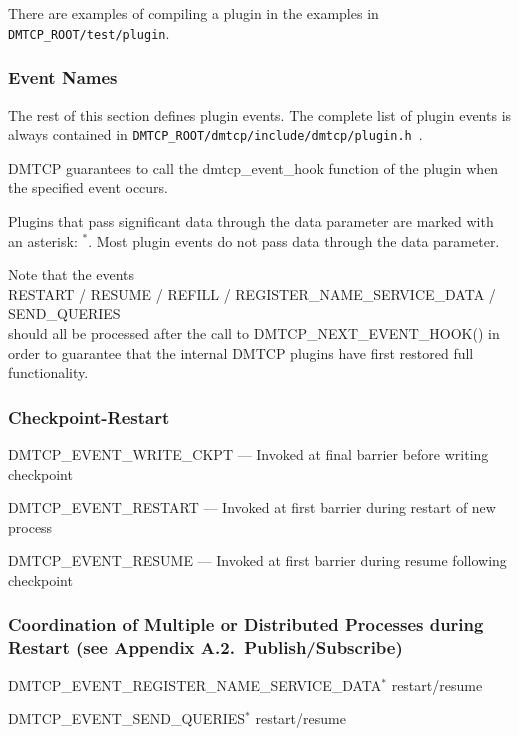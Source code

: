 \documentclass{article}
\begin{document}
There are examples of compiling a plugin in the examples in {\tt
DMTCP\_ROOT/test/plugin}.

\subsubsection{Event Names}

The rest of this section defines plugin events.
The complete list of plugin events is always contained in
{\tt DMTCP\_ROOT/dmtcp/include/dmtcp/plugin.h}~.

DMTCP guarantees to call the dmtcp\_event\_hook function of the plugin
when the specified event occurs.

Plugins that pass significant data through the data parameter
are marked with an asterisk: {}$^*$.
Most plugin events do not pass data through the data parameter.

Note that the events \\
   RESTART / RESUME / REFILL / REGISTER\_NAME\_SERVICE\_DATA / SEND\_QUERIES \\
should all be processed after the call to DMTCP\_NEXT\_EVENT\_HOOK() in
order to guarantee that the internal DMTCP plugins have first restored full
functionality.

\itemsep0pt
\subsubsection*{Checkpoint-Restart}
\begin{list}{}{\leftmargin=3em \itemindent=-2em}
\item
  DMTCP\_EVENT\_WRITE\_CKPT --- Invoked at final barrier before writing checkpoint
\item
  DMTCP\_EVENT\_RESTART --- Invoked at first barrier during restart of new process
\item
  DMTCP\_EVENT\_RESUME --- Invoked at first barrier during resume following checkpoint
\end{list}

\subsubsection*{Coordination of Multiple or Distributed Processes during Restart
	(see Appendix A.2.~Publish/Subscribe)}
\begin{list}{}{\leftmargin=3em \itemindent=-2em}
\item
  DMTCP\_EVENT\_REGISTER\_NAME\_SERVICE\_DATA$^*$ restart/resume
\item
  DMTCP\_EVENT\_SEND\_QUERIES$^*$ restart/resume
\end{list}
\end{document}
